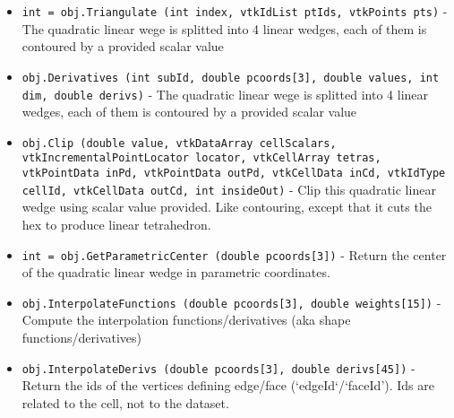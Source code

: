 \begin{itemize}
\item  \verb|int = obj.Triangulate (int index, vtkIdList ptIds, vtkPoints pts)| -  The quadratic linear wege is splitted into 4 linear wedges,
 each of them is contoured by a provided scalar value

\item  \verb|obj.Derivatives (int subId, double pcoords[3], double values, int dim, double derivs)| -  The quadratic linear wege is splitted into 4 linear wedges,
 each of them is contoured by a provided scalar value

\item  \verb|obj.Clip (double value, vtkDataArray cellScalars, vtkIncrementalPointLocator locator, vtkCellArray tetras, vtkPointData inPd, vtkPointData outPd, vtkCellData inCd, vtkIdType cellId, vtkCellData outCd, int insideOut)| -  Clip this quadratic linear wedge using scalar value provided. Like
 contouring, except that it cuts the hex to produce linear
 tetrahedron.

\item  \verb|int = obj.GetParametricCenter (double pcoords[3])| -  Return the center of the quadratic linear wedge in parametric coordinates.

\item  \verb|obj.InterpolateFunctions (double pcoords[3], double weights[15])| -  Compute the interpolation functions/derivatives
 (aka shape functions/derivatives)

\item  \verb|obj.InterpolateDerivs (double pcoords[3], double derivs[45])| -  Return the ids of the vertices defining edge/face (`edgeId`/`faceId').
 Ids are related to the cell, not to the dataset.

\end{itemize}
